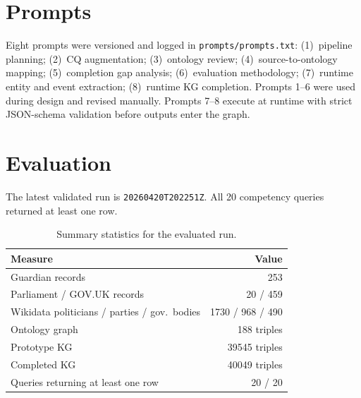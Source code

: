 \documentclass[runningheads]{llncs}
\newcommand{\filepath}[1]{%
  \begingroup\hypersetup{urlcolor=black}\nolinkurl{#1}\endgroup}
\newcommand{\code}[1]{\texttt{#1}}
\begin{document}
\section{Prompts}\label{sec:prompts}

Eight prompts were versioned and logged in \filepath{prompts/prompts.txt}:
(1)~pipeline planning; (2)~CQ augmentation; (3)~ontology review;
(4)~source-to-ontology mapping; (5)~completion gap analysis;
(6)~evaluation methodology; (7)~runtime entity and event extraction;
(8)~runtime KG completion.
Prompts 1--6 were used during design and revised manually. Prompts 7--8 execute at
runtime with strict JSON-schema validation before outputs enter the graph.

\section{Evaluation}\label{sec:evaluation}

The latest validated run is \code{20260420T202251Z}. All 20 competency queries returned
at least one row.

\begin{table}[t]
\centering
\caption{Summary statistics for the evaluated run.}
\label{tab:stats}
\begin{tabular}{@{}lr@{}}
\toprule
\textbf{Measure} & \textbf{Value} \\
\midrule
Guardian records & 253 \\
Parliament / GOV.UK records & 20 / 459 \\
Wikidata politicians / parties / gov.\ bodies & 1730 / 968 / 490 \\
Ontology graph & 188 triples \\
Prototype KG & 39545 triples \\
Completed KG & 40049 triples \\
Queries returning at least one row & 20 / 20 \\
\bottomrule
\end{tabular}
\end{table}
\end{document}
